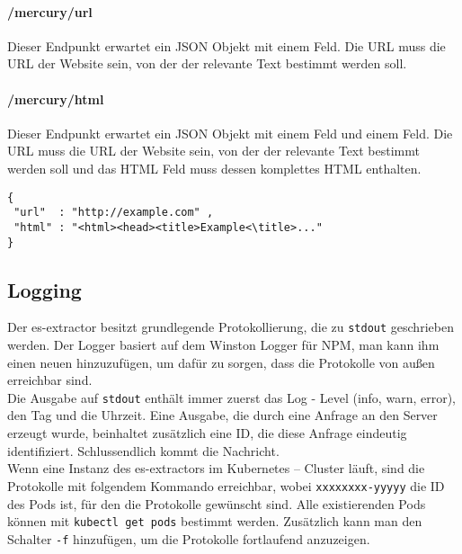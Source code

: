 \paragraph{/mercury/url} Dieser Endpunkt erwartet ein \ac{JSON} Objekt mit einem  Feld. Die URL muss die URL der Website sein, von der der relevante Text bestimmt werden soll.
\paragraph{/mercury/html} Dieser Endpunkt erwartet ein \ac{JSON} Objekt mit einem  Feld und einem  Feld. Die URL muss die URL der Website sein, von der der relevante Text bestimmt werden soll und das HTML Feld muss dessen komplettes HTML enthalten.
\begin{verbatim}
{
 "url"  : "http://example.com" , 
 "html" : "<html><head><title>Example<\title>..."
}
\end{verbatim}

\subsection{Logging}
Der es-extractor besitzt grundlegende Protokollierung, die zu \verb|stdout| geschrieben werden. Der Logger basiert auf dem Winston Logger für NPM, man kann ihm einen neuen  hinzuzufügen, um dafür zu sorgen, dass die Protokolle von außen erreichbar sind. \cite{winston2019} \\ 
Die Ausgabe auf \verb|stdout| enthält immer zuerst das Log - Level (info, warn, error), den Tag und die Uhrzeit. Eine Ausgabe, die durch eine Anfrage an den Server erzeugt wurde, beinhaltet zusätzlich eine ID, die diese Anfrage eindeutig identifiziert. Schlussendlich kommt die Nachricht. \\
Wenn eine Instanz des es-extractors im Kubernetes  – Cluster läuft, sind die Protokolle mit folgendem Kommando erreichbar, wobei \verb|xxxxxxxx-yyyyy| die ID des Pods ist, für den die Protokolle gewünscht sind. Alle existierenden Pods können mit \texttt{kubectl get pods} bestimmt werden.
Zusätzlich kann man den Schalter \verb|-f| hinzufügen, um die Protokolle fortlaufend anzuzeigen.
 
